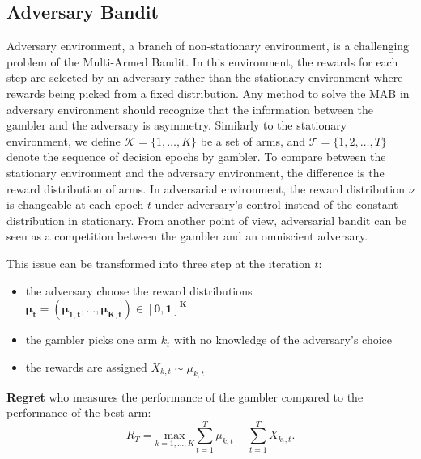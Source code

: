 \subsection{Adversary Bandit}
\label{subsec:advesary}

Adversary environment\cite{auer2003nonstochastic}, a branch of non-stationary environment, is a challenging problem of the Multi-Armed Bandit. In this environment, the rewards for each step are selected by an adversary rather than the stationary environment where rewards being picked from a fixed distribution. Any method to solve the MAB in adversary environment should recognize that the information between the gambler and the adversary is asymmetry. Similarly to the stationary environment, we define $\mathscr{K} = \{1, \dots, K\}$ be a set of arms, and $\mathscr{T} = \{1,2,\dots,T\}$ denote the sequence of decision epochs by gambler. To compare between the stationary environment and the adversary environment, the difference is the reward distribution of arms. In adversarial environment, the reward distribution $\nu$ is changeable at each epoch $t$ under adversary's control instead of the constant distribution in stationary. From another point of view, adversarial bandit can be seen as a competition between the gambler and an omniscient adversary. 

This issue can be transformed into three step at the iteration $t$:
\begin{itemize}
\item	the adversary choose the reward distributions $\mathbf{\mu_t = (\mu_{1,t},\dots, \mu_{K,t}) \in [0,1]^K }$
\item	the gambler picks one arm $k_t$ with no knowledge of the adversary's choice 
\item	the rewards are assigned $X_{k,t} \sim \mu_{k,t}$
\end{itemize}

\textbf{Regret} who measures the performance of the gambler compared to the performance of the best arm:
\[R_T = \underset{k=1,\dots,K}{\text{max}}\sum_{t=1}^T \mu_{k,t} - \sum_{t=1}^T X_{k_t,t}.\]
